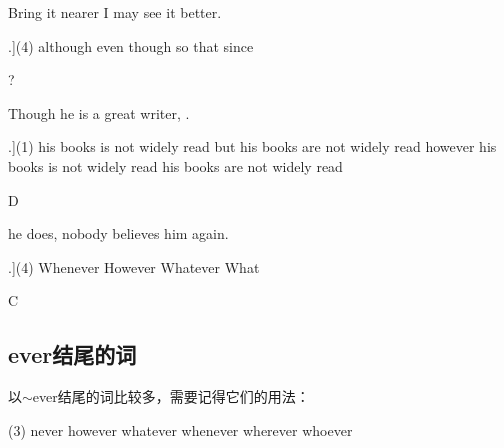 \documentclass[a4paper]{article}
\begin{document}
\begin{question}
 Bring it nearer \blank[width=1cm]{} I may see it better.

   \begin{tasks}[counter-format=tsk[A].](4)
              \task although
              \task even though
              \task so that
              \task since
   \end{tasks}

\end{question}
\begin{solution}
?
\end{solution}

\begin{question}
 Though he is a great writer,  \blank[width=2cm]{}.

   \begin{tasks}[counter-format=tsk[A].](1)
              \task his books is not widely read
              \task but his books are not widely read
              \task however his books is not widely read
              \task his books are not widely read
   \end{tasks}

\end{question}
\begin{solution}
D
\end{solution}

\begin{question}
 \blank*[width=1cm]{} he does, nobody believes him again.

   \begin{tasks}[counter-format=tsk[A].](4)
              \task Whenever
              \task However
              \task Whatever
              \task What
   \end{tasks}

\end{question}
\begin{solution}
C
\end{solution}


  \subsection{ever结尾的词}
以$\sim$ever结尾的词比较多，需要记得它们的用法：

\begin{tasks}[style=enumerate, label-offset=1em, label-align=right](3)
  \task never  \task however
  \task whatever \task whenever
  \task wherever \task whoever
\end{tasks}
\end{document}
